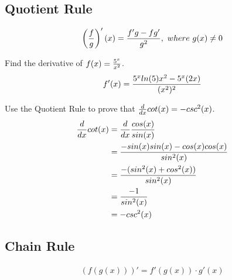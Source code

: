 \subsection{Quotient Rule}

\begin{theorem}
    \begin{align}
        \left({f \over g}\right)'(x) = {f'g - fg' \over g^2},\ where\ g(x) \neq 0
    \end{align}
\end{theorem}

\begin{exercise}\nonumber
    Find the derivative of $ f(x) = {5^x \over x^2} $. \\

    \begin{align}
        f'(x) = {5^xln(5)x^2 - 5^x(2x) \over (x^2)^2}
    \end{align}
\end{exercise}

\begin{exercise}\nonumber
    Use the Quotient Rule to prove that $ {d \over dx}cot(x) = -csc^2(x) $. \\

    \begin{align}
        {d \over dx}cot(x) & = {d \over dx}{cos(x) \over sin(x)}             \\
                           & = {-sin(x)sin(x) - cos(x)cos(x) \over sin^2(x)} \\
                           & = {-(sin^2(x) + cos^2(x)) \over sin^2(x)}       \\
                           & = {-1 \over sin^2(x)}                           \\
                           & = -csc^2(x)
    \end{align}
\end{exercise}

\subsection{Chain Rule}

\begin{theorem}
    \begin{align}
        (f(g(x)))' = f'(g(x)) \cdot g'(x)
    \end{align}
\end{theorem}

